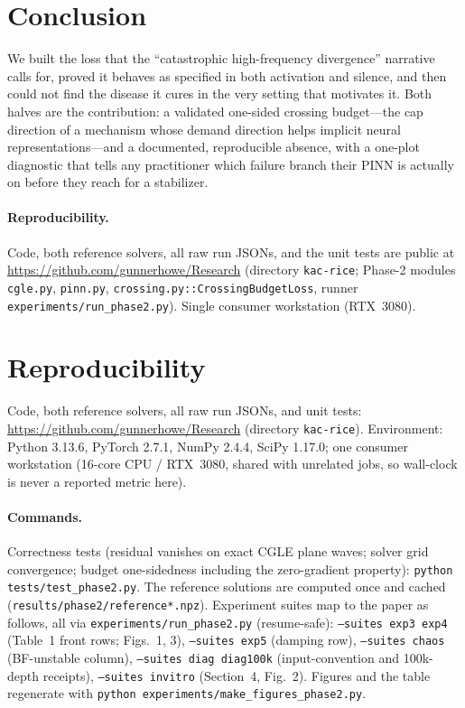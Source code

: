 \documentclass[10pt]{article}
\begin{document}
\section{Conclusion}

We built the loss that the ``catastrophic high-frequency divergence'' narrative
calls for, proved it behaves as specified in both activation and silence, and then
could not find the disease it cures in the very setting that motivates it. Both
halves are the contribution: a validated one-sided crossing budget---the cap
direction of a mechanism whose demand direction helps implicit neural
representations---and a documented, reproducible absence, with a one-plot diagnostic
that tells any practitioner which failure branch their PINN is actually on before
they reach for a stabilizer.

\paragraph{Reproducibility.} Code, both reference solvers, all raw run JSONs, and
the unit tests are public at \url{https://github.com/gunnerhowe/Research}
(directory \texttt{kac-rice}; Phase-2 modules \texttt{cgle.py}, \texttt{pinn.py},
\texttt{crossing.py::CrossingBudgetLoss}, runner
\texttt{experiments/run\_phase2.py}). Single consumer workstation (RTX~3080).




\appendix

\section{Reproducibility}
\label{app:repro}

Code, both reference solvers, all raw run JSONs, and unit tests:
\url{https://github.com/gunnerhowe/Research} (directory \texttt{kac-rice}).
Environment: Python 3.13.6, PyTorch 2.7.1, NumPy 2.4.4, SciPy 1.17.0; one
consumer workstation (16-core CPU / RTX~3080, shared with unrelated jobs, so
wall-clock is never a reported metric here).

\paragraph{Commands.} Correctness tests (residual vanishes on exact CGLE
plane waves; solver grid convergence; budget one-sidedness including the
zero-gradient property): \texttt{python tests/test\_phase2.py}. The reference
solutions are computed once and cached
(\texttt{results/phase2/reference*.npz}). Experiment suites map to the paper
as follows, all via \texttt{experiments/run\_phase2.py} (resume-safe):
\texttt{--suites exp3 exp4} (Table~1 front rows; Figs.~1, 3),
\texttt{--suites exp5} (damping row), \texttt{--suites chaos}
(BF-unstable column), \texttt{--suites diag diag100k} (input-convention and
100k-depth receipts), \texttt{--suites invitro} (Section~4, Fig.~2). Figures
and the table regenerate with
\texttt{python experiments/make\_figures\_phase2.py}.
\end{document}
